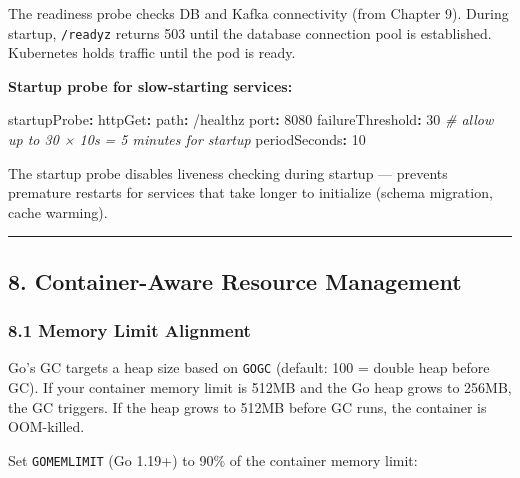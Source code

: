 \documentclass[
]{article}
\newenvironment{Shaded}{}{}
\newcommand{\AttributeTok}[1]{\textcolor[rgb]{0.49,0.56,0.16}{#1}}
\newcommand{\CommentTok}[1]{\textcolor[rgb]{0.38,0.63,0.69}{\textit{#1}}}
\newcommand{\DecValTok}[1]{\textcolor[rgb]{0.25,0.63,0.44}{#1}}
\newcommand{\FunctionTok}[1]{\textcolor[rgb]{0.02,0.16,0.49}{#1}}
\newcommand{\KeywordTok}[1]{\textcolor[rgb]{0.00,0.44,0.13}{\textbf{#1}}}
\begin{document}
The readiness probe checks DB and Kafka connectivity (from Chapter 9).
During startup, \texttt{/readyz} returns 503 until the database
connection pool is established. Kubernetes holds traffic until the pod
is ready.

\textbf{Startup probe for slow-starting services:}

\begin{Shaded}
\begin{Highlighting}[]
\AttributeTok{    }\FunctionTok{startupProbe}\KeywordTok{:}
\AttributeTok{      }\FunctionTok{httpGet}\KeywordTok{:}
\AttributeTok{        }\FunctionTok{path}\KeywordTok{:}\AttributeTok{ /healthz}
\AttributeTok{        }\FunctionTok{port}\KeywordTok{:}\AttributeTok{ }\DecValTok{8080}
\AttributeTok{      }\FunctionTok{failureThreshold}\KeywordTok{:}\AttributeTok{ }\DecValTok{30}\CommentTok{   \# allow up to 30 × 10s = 5 minutes for startup}
\AttributeTok{      }\FunctionTok{periodSeconds}\KeywordTok{:}\AttributeTok{ }\DecValTok{10}
\end{Highlighting}
\end{Shaded}

The startup probe disables liveness checking during startup --- prevents
premature restarts for services that take longer to initialize (schema
migration, cache warming).

\begin{center}\rule{0.5\linewidth}{0.5pt}\end{center}

\hypertarget{container-aware-resource-management}{%
\subsection{8. Container-Aware Resource
Management}\label{container-aware-resource-management}}

\hypertarget{memory-limit-alignment}{%
\subsubsection{8.1 Memory Limit
Alignment}\label{memory-limit-alignment}}

Go's GC targets a heap size based on \texttt{GOGC} (default: 100 =
double heap before GC). If your container memory limit is 512MB and the
Go heap grows to 256MB, the GC triggers. If the heap grows to 512MB
before GC runs, the container is OOM-killed.

Set \texttt{GOMEMLIMIT} (Go 1.19+) to 90\% of the container memory
limit:
\end{document}
